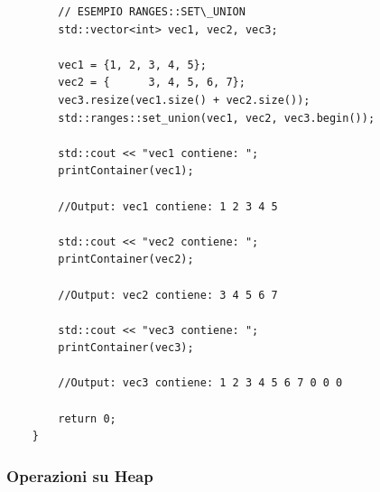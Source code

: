 \begin{lstlisting}
		// ESEMPIO RANGES::SET\_UNION
		std::vector<int> vec1, vec2, vec3;
		
		vec1 = {1, 2, 3, 4, 5};
		vec2 = {      3, 4, 5, 6, 7};
		vec3.resize(vec1.size() + vec2.size());
		std::ranges::set_union(vec1, vec2, vec3.begin());
		
		std::cout << "vec1 contiene: ";
		printContainer(vec1);
		
		//Output: vec1 contiene: 1 2 3 4 5 
		
		std::cout << "vec2 contiene: ";
		printContainer(vec2);
		
		//Output: vec2 contiene: 3 4 5 6 7
		
		std::cout << "vec3 contiene: ";
		printContainer(vec3);
		
		//Output: vec3 contiene: 1 2 3 4 5 6 7 0 0 0 
		
		return 0;
	}
\end{lstlisting}

\subsubsection{Operazioni su Heap}

\label{ranges_heap}

